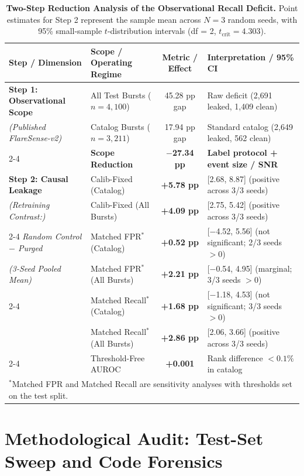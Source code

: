 \documentclass[11pt,a4paper]{article}
\begin{document}
\begin{table}[t]
\centering
\small
\caption{\textbf{Two-Step Reduction Analysis of the Observational Recall Deficit.} Point estimates for Step 2 represent the sample mean across $N=3$ random seeds, with 95\% small-sample $t$-distribution intervals (df = 2, $t_{\text{crit}} = 4.303$).}
\label{tab:reduction}
\begin{tabular}{llcl}
\toprule
\textbf{Step / Dimension} & \textbf{Scope / Operating Regime} & \textbf{Metric / Effect} & \textbf{Interpretation / 95\% CI} \\
\midrule
\textbf{Step 1: Observational Scope} & All Test Bursts ($n=4,100$) & 45.28 pp gap & Raw deficit (2,691 leaked, 1,409 clean) \\
\textit{(Published FlareSense-v2)} & Catalog Bursts ($n=3,211$) & 17.94 pp gap & Standard catalog (2,649 leaked, 562 clean) \\
\cmidrule{2-4}
 & \textbf{Scope Reduction} & \textbf{$-$27.34 pp} & \textbf{Label protocol + event size / SNR} \\
\midrule
\textbf{Step 2: Causal Leakage} & Calib-Fixed (Catalog) & \textbf{+5.78 pp} & [2.68, 8.87] (positive across 3/3 seeds) \\
\textit{(Retraining Contrast:)} & Calib-Fixed (All Bursts) & \textbf{+4.09 pp} & [2.75, 5.42] (positive across 3/3 seeds) \\
\cmidrule{2-4}
\textit{Random Control $-$ Purged} & Matched FPR$^*$ (Catalog) & \textbf{+0.52 pp} & [$-$4.52, 5.56] (not significant; 2/3 seeds $>0$) \\
\textit{(3-Seed Pooled Mean)} & Matched FPR$^*$ (All Bursts) & \textbf{+2.21 pp} & [$-$0.54, 4.95] (marginal; 3/3 seeds $>0$) \\
\cmidrule{2-4}
 & Matched Recall$^*$ (Catalog) & \textbf{+1.68 pp} & [$-$1.18, 4.53] (not significant; 3/3 seeds $>0$) \\
 & Matched Recall$^*$ (All Bursts) & \textbf{+2.86 pp} & [2.06, 3.66] (positive across 3/3 seeds) \\
\cmidrule{2-4}
 & Threshold-Free AUROC & \textbf{+0.001} & Rank difference $< 0.1\%$ in catalog \\
\bottomrule
\multicolumn{4}{l}{\footnotesize $^*$Matched FPR and Matched Recall are sensitivity analyses with thresholds set on the test split.}
\end{tabular}
\end{table}

\section{Methodological Audit: Test-Set Sweep and Code Forensics}
\end{document}
